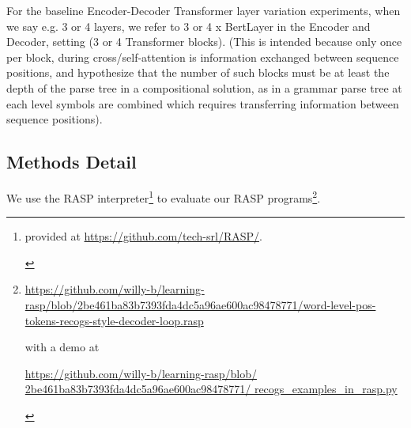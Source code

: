 \documentclass[11pt]{article}
\begin{document}
For the \citep{Wu2023} baseline Encoder-Decoder Transformer layer variation experiments, 
when we say e.g. 3 or 4 layers, we refer to 3 or 4 x BertLayer in the Encoder and Decoder, setting (3 or 4 Transformer blocks).
(This is intended because only once per block, during cross/self-attention is information exchanged between sequence positions, and \citep{Csordas2022} hypothesize that the number of such blocks must be at least the depth of the parse tree in a compositional solution, as in a grammar parse tree at each level symbols are combined which requires transferring information between sequence positions).


\subsection{Methods Detail}
\label{methods_detail}

We use the RASP \citep{Weiss2021} interpreter\footnote{\begin{footnotesize}provided at \href{https://github.com/tech-srl/RASP/}{https://github.com/tech-srl/RASP/}.
\end{footnotesize}
} to evaluate our RASP programs\footnote{\begin{footnotesize}\href{https://github.com/willy-b/learning-rasp/blob/2be461ba83b7393fda4dc5a96ae600ac98478771/word-level-pos-tokens-recogs-style-decoder-loop.rasp}{https://github.com/willy-b/learning-rasp/blob/2be461ba83b7393fda4dc5a96ae600ac98478771/word-level-pos-tokens-recogs-style-decoder-loop.rasp}

with a demo at

\href{https://github.com/willy-b/learning-rasp/blob/2be461ba83b7393fda4dc5a96ae600ac98478771/recogs\_examples\_in\_rasp.py}{https://github.com/willy-b/learning-rasp/blob/
2be461ba83b7393fda4dc5a96ae600ac98478771/
recogs\_examples\_in\_rasp.py}
\end{footnotesize}}.
\end{document}
